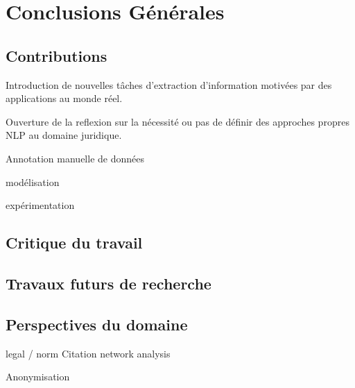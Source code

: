 \chapter*{Conclusions Générales}
\label{sec:conclusion}

\section{Contributions}
\label{sec:conclusion:contributions}
Introduction de nouvelles tâches d'extraction d'information motivées par des applications au monde réel.

Ouverture de la reflexion sur la nécessité ou pas de définir des approches propres NLP au domaine juridique.

Annotation manuelle de données

modélisation

expérimentation


\section{Critique du travail}
\label{sec:conclusion:critique}

\section{Travaux futurs de recherche}
\label{sec:conclusion:extensions}

\section{Perspectives du domaine}
\label{sec:conclusion:perspectives}
legal / norm Citation network analysis

Anonymisation